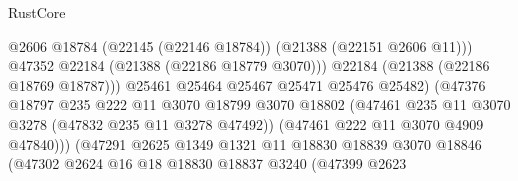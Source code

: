 \begin{lexlean}{RustCore}
\begin{coremodule}
                                                  @2606
                                                  @18784
                                                  (@22145 (@22146 @18784))
                                                  (@21388 (@22151 @2606 @11)))
                                                @47352
                                                @22184
                                                (@21388 (@22186 @18779 @3070)))
                                              @22184
                                              (@21388 (@22186 @18769 @18787)))
                                            @25461
                                            @25464
                                            @25467
                                            @25471
                                            @25476
                                            @25482)
                                          (@47376
                                            @18797
                                            @235
                                            @222
                                            @11
                                            @3070
                                            @18799
                                            @3070
                                            @18802
                                            (@47461
                                              @235
                                              @11
                                              @3070
                                              @3278
                                              (@47832 @235 @11 @3278 @47492))
                                            (@47461 @222 @11 @3070 @4909 @47840)))
                                        (@47291
                                          @2625
                                          @1349
                                          @1321
                                          @11
                                          @18830
                                          @18839
                                          @3070
                                          @18846
                                          (@47302
                                            @2624
                                            @16
                                            @18
                                            @18830
                                            @18837
                                            @3240
                                            (@47399
                                              @2623

\end{coremodule}
\end{lexlean}
